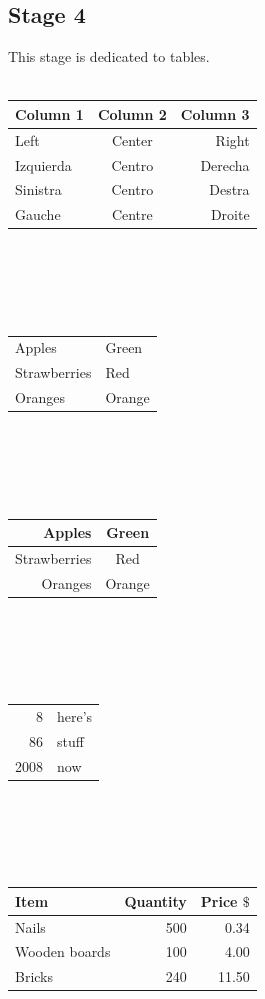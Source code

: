 \documentclass[a4paper,12pt]{article}
\begin{document}
		\subsection{Stage 4}
		This stage is dedicated to tables.\\
		\\
		\begin{tabular}{|l|c|r|}
			\hline
			Column 1 & Column 2 & Column 3\\
			\hline
			Left & Center & Right\\
			Izquierda & Centro & Derecha\\
			Sinistra & Centro & Destra\\
			Gauche & Centre & Droite\\
			\hline
		\end{tabular}
		\\\\\\\\ %
		\begin{tabular}{|l|l|}
			Apples & Green \\
			Strawberries & Red \\
			Oranges & Orange \\
		\end{tabular}
		\\\\\\\\
		\begin{tabular}{rc}
			Apples & Green \\
			\hline
			Strawberries & Red \\
			\cline{1-1}
			Oranges & Orange \\
		\end{tabular}
		\\\\\\\\
		\begin{tabular}{|r|l|}
			\hline
			8 & here’s \\
			\cline{2-2}
			86 & stuff \\
			\hline \hline
			2008 & now \\
			\hline
		\end{tabular}
		\\\\\\\\
		\begin{tabular}{l|r|r}
			Item & Quantity & Price  \(\$\)\\
			\hline
			Nails & 500 & 0.34\\
			Wooden boards & 100 & 4.00\\
			Bricks & 240 & 11.50\\
		\end{tabular}
\end{document}
